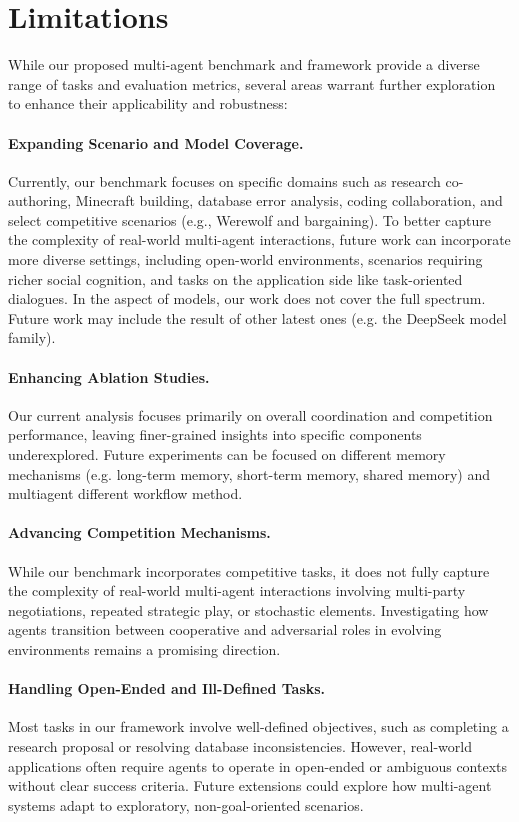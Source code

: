 \section{Limitations}
While our proposed multi-agent benchmark and framework provide a diverse range of tasks and evaluation metrics, several areas warrant further exploration to enhance their applicability and robustness:

\paragraph{Expanding Scenario and Model Coverage.}
Currently, our benchmark focuses on specific domains such as research co-authoring, Minecraft building, database error analysis, coding collaboration, and select competitive scenarios (e.g., Werewolf and bargaining). To better capture the complexity of real-world multi-agent interactions, future work can incorporate more diverse settings, including open-world environments, scenarios requiring richer social cognition, and tasks on the application side like task-oriented dialogues. In the aspect of models, our work does not cover the full spectrum. Future work may include the result of other latest ones (e.g. the DeepSeek model family).

\paragraph{Enhancing Ablation Studies.}
Our current analysis focuses primarily on overall coordination and competition performance, leaving finer-grained insights into specific components underexplored. Future experiments can be focused on different memory mechanisms (e.g. long-term memory, short-term memory, shared memory) and multiagent different workflow method.

\paragraph{Advancing Competition Mechanisms.}
While our benchmark incorporates competitive tasks, it does not fully capture the complexity of real-world multi-agent interactions involving multi-party negotiations, repeated strategic play, or stochastic elements. Investigating how agents transition between cooperative and adversarial roles in evolving environments remains a promising direction.

\paragraph{Handling Open-Ended and Ill-Defined Tasks.}
Most tasks in our framework involve well-defined objectives, such as completing a research proposal or resolving database inconsistencies. However, real-world applications often require agents to operate in open-ended or ambiguous contexts without clear success criteria. Future extensions could explore how multi-agent systems adapt to exploratory, non-goal-oriented scenarios.
